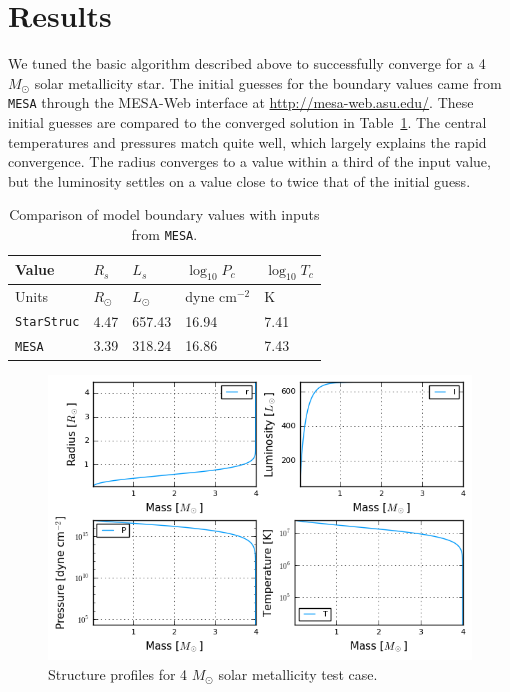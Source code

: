 \documentclass[onecolumn]{article}
\begin{document}
\section{Results}

We tuned the basic algorithm described above to successfully converge for a 4 $M_\odot$ solar metallicity star.  The initial guesses for the boundary values came from \texttt{MESA} through the MESA-Web interface at \url{http://mesa-web.asu.edu/}.  These initial guesses are compared to the converged solution in Table~\ref{tab:results}.  The central temperatures and pressures match quite well, which largely explains the rapid convergence.  The radius converges to a value within a third of the input value, but the luminosity settles on a value close to twice that of the initial guess.

\begin{table}[h]
  \centering
  \begin{tabular}{lllll}
    Value & $R_s$ & $L_s$ & $\log_{10} P_c$ & $\log_{10} T_c$ \\
    \toprule
    Units & $R_\odot$ & $L_\odot$ & dyne cm$^{-2}$ & K \\
    \midrule
    \texttt{StarStruc} & 4.47 & 657.43 & 16.94 & 7.41 \\
    \texttt{MESA} & 3.39 & 318.24 & 16.86 & 7.43 \\
    \bottomrule
  \end{tabular}
  \caption{Comparison of model boundary values with inputs from \texttt{MESA}.}
  \label{tab:results}
\end{table}

\begin{figure}[h]
  \centering
  \includegraphics[width=0.9\linewidth]{mstar4.png}
  \caption{Structure profiles for 4 $M_\odot$ solar metallicity test case.}
\end{figure}
\end{document}
